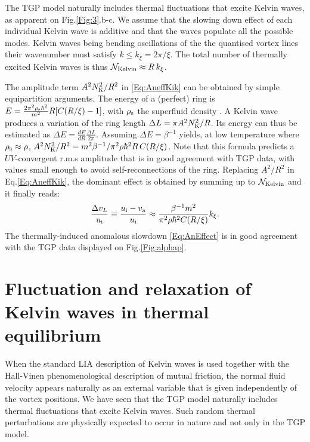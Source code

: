 \documentclass[sn-mathphys]{sn-jnl}%
\begin{document}
The TGP model naturally includes thermal fluctuations that excite Kelvin waves, as apparent on Fig.\ref{Fig:3}.b-c. 
%
We assume that the slowing down effect of each individual Kelvin wave is additive and that the waves populate all the possible modes. 
%
Kelvin waves being bending oscillations of the the quantised vortex lines their wavenumber must satisfy $k \le k_\xi= 2 \pi / \xi$. The total number of thermally excited Kelvin waves is thus
$\mathcal{N}_{\rm Kelvin}\approx R\,k_\xi$.

The amplitude term $A^2N_{\rm K}^2/R^2$ in \eqref{Eq:AneffKik} can be obtained by simple equipartition arguments. The energy of a (perfect) ring is $E=\frac{2 \pi^2\rho_{\rm s}\hbar^2}{m^2}R[C(R/\xi)-1 ]$, with $\rho_{\rm s}$ the superfluid density \cite{Donnelly}.  A Kelvin wave produces a variation of the ring length $\Delta L=\pi A^2 N_{\rm K}^2/R$. Its energy can thus be estimated as
$\Delta E=\frac{dE}{dR}\frac{\Delta L}{2\pi}.$
Assuming $\Delta E=\beta^{-1}$ yields, at low temperature where $\rho_{\rm s}\approx\rho$, $A^2N_{\rm K}^2/R^2=m^2\beta^{-1}/\pi^2\rho\hbar^2R\,C(R/\xi)$. Note that this formula predicts a $UV$-convergent r.m.s amplitude that is in good agreement with TGP data, with values small enough to avoid self-reconnections of the ring.
Replacing $A^2/R^2$ in Eq.\eqref{Eq:AneffKik}, the dominant effect is obtained by summing up to $\mathcal{N}_{\rm Kelvin}$ and it finally reads:
\begin{equation}
\frac{\Delta v_{L}}{u_{\rm i}}\equiv\frac{u_{\rm i}-v_{\rm a}}{u_{\rm i}}\approx\frac{\beta^{-1}m^{2}}{\pi^2 \rho \hbar^{2}C(R/\xi)}k_\xi\label{Eq:AnEffect}.
\end{equation}
The thermally-induced anomalous slowdown \eqref{Eq:AnEffect} is in good agreement with the TGP data displayed on Fig.\ref{Fig:alphap}.


\section{Fluctuation and relaxation of Kelvin waves in thermal equilibrium}\label{sec:new}
When the standard LIA description of Kelvin waves is used together with the Hall-Vinen  \cite{HallVinen1_1956,HallVinen2_1956} phenomenological description of mutual friction, the normal fluid velocity appears naturally as an external variable that is given independently of the vortex positions.
We have seen that the TGP model naturally includes thermal fluctuations that excite Kelvin waves.  Such random thermal perturbations are physically expected to occur in nature and not only in the TGP model. 
\end{document}
